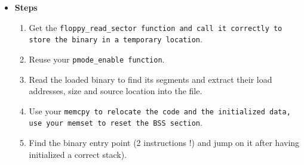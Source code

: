 {\begin{itemize}
The ELF file \textbf{must} contain two segments, one with the code (which
must be loaded at 1 Mb) and the other with the data (loaded at 2
Mb). Example:

\begin{verbatim}
42sh> readelf -l bootloader

Elf file type is EXEC (Executable file)
Entry point 0x1000cc
There are 2 program headers, starting at offset 52

Program Headers:
  Type           Offset   VirtAddr   PhysAddr   FileSiz MemSiz  Flg Align
  LOAD           0x001000 0x00100000 0x00100000 0x000df 0x000df R E 0x1000
  LOAD           0x002000 0x00200000 0x00200000 0x00022 0x00028 RW  0x1000

 Section to Segment mapping:
  Segment Sections...
   00     .text
   01     .data .rodata .bss
\end{verbatim}

Your bootloader \textbf{must} reset the BSS memory. To keep the thing
simple, put the \emph{.bss} section at the end of the second
segment. Its size can be determined by computing the difference
between MemSize and FileSiz.

Your tarball \textbf{must} include the ld-script used to create such
ELF binaries.

Before starting, you should watch the ELF documentation, especially
about the ELF header and the Program Header. The task is not as harder
as it looks like (our code dealing with ELF files is about 30
instructions long).\\
\item {\bf Steps}
  \begin{enumerate}

    \item {Get the \tt floppy\_read\_sector \rm function and call it
    correctly to store the binary in a temporary location}.

    \item {Reuse your \tt pmode\_enable \rm function}.

    \item {Read the loaded binary to find its segments and extract
    their load addresses, size and source location into the file}.

    \item {Use your \tt memcpy \rm to relocate the code and the
    initialized data, use your \tt memset \rm to reset the BSS section}.

    \item {Find the binary entry point (2 instructions !) and jump on
    it after having initialized a correct stack)}.


\end{enumerate}
\end{itemize}}
